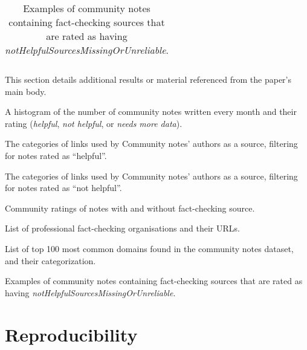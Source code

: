 \begin{table*}
\begin{tabular}{lp{14cm}}
\bottomrule
\end{tabular}
\caption{Examples of community notes containing fact-checking sources that are rated as having \textit{notHelpfulSourcesMissingOrUnreliable}.}
\label{tab:notes_with_bad_source.}
\end{table*}

This section details additional results or material referenced from the paper's main body.


\noindent \textbf{} A histogram of the number of community notes written every month and their rating (\textit{helpful}, \textit{not helpful}, or \textit{needs more data}).

\noindent \textbf{} The categories of links used by Community notes' authors as a source, filtering for notes rated as ``helpful''.

\noindent \textbf{} The categories of links used by Community notes' authors as a source, filtering for notes rated as ``not helpful''.


\noindent \textbf{} Community ratings of notes with and without fact-checking source.

\noindent \textbf{} List of professional fact-checking organisations and their URLs.

\noindent \textbf{} List of top 100 most common domains found in the community notes dataset, and their categorization.

\noindent \textbf{} Examples of community notes containing fact-checking sources that are rated as having \textit{notHelpfulSourcesMissingOrUnreliable}.


\section{Reproducibility}
\label{app:reproducibility}


